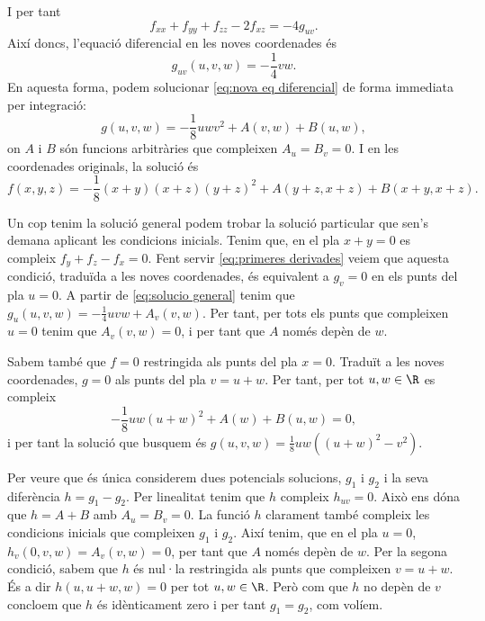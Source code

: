 \documentclass[12pt, a4paper]{article}
\begin{document}
I per tant 
\begin{equation}
  f_{xx} + f_{yy} + f_{zz} - 2f_{xz} = -4g_{uv}. 
\end{equation}
Així doncs, l'equació diferencial en les noves coordenades és 
\begin{equation}
  g_{uv}(u,v,w) = -\dfrac{1}{4}vw. \label{eq:nova eq diferencial}
\end{equation}
En aquesta forma, podem solucionar \ref{eq:nova eq diferencial} de forma immediata per integració:
\begin{equation}
  g(u,v,w) = -\dfrac{1}{8}uwv^2 + A(v,w) + B(u,w), \label{eq:solucio general}
\end{equation}
on \( A \) i \( B \) són funcions arbitràries que compleixen \( A_u = B_v = 0 \). I en les coordenades originals, la solució és
\begin{equation}
  f(x,y,z) = -\dfrac{1}{8}(x+y)(x+z)(y+z)^2 + A(y+z,x+z) + B(x+y,x+z).
\end{equation}

Un cop tenim la solució general podem trobar la solució particular que sen's demana aplicant les condicions inicials. Tenim que, en el pla \( x+y = 0 \) es compleix \( f_y + f_z - f_x = 0 \). Fent servir \ref{eq:primeres derivades} veiem que aquesta condició, traduïda a les noves coordenades, és equivalent a \( g_v = 0 \) en els punts del pla \( u = 0 \). A partir de \ref{eq:solucio general} tenim que \( g_u(u,v,w) = -\frac{1}{4}uvw + A_v(v,w) \). Per tant, per tots els punts que compleixen \( u = 0 \) tenim que \( A_v(v,w) = 0 \), i per tant que \( A \) només depèn de \( w \).

Sabem també que \( f = 0 \) restringida als punts del pla \( x = 0 \). Traduït a les noves coordenades, \( g = 0 \) als punts del pla \( v = u + w \). Per tant, per tot \( u,w \in \R \) es compleix
\begin{equation*}
  -\dfrac{1}{8}uw(u+w)^2 + A(w) + B(u,w) = 0,
\end{equation*}
i per tant la solució que busquem és \( g(u,v,w) = \frac{1}{8}uw\left((u+w)^2 - v^2\right) \).

Per veure que és única considerem dues potencials solucions, \( g_1 \) i \( g_2 \) i la seva diferència \( h = g_1 -g_2 \). Per linealitat tenim que \( h \) compleix \( h_{uv} = 0 \). Això ens dóna que \( h = A + B	\) amb \( A_u = B_v = 0 \). La funció \( h \) clarament també compleix les condicions inicials que compleixen \( g_1 \) i \( g_2 \). Així tenim, que en el pla \( u = 0 \), \( h_v(0,v,w) = A_v(v,w) = 0 \), per tant que \( A \) només depèn de \( w \). Per la segona condició, sabem que \( h \) és nul·la restringida als punts que compleixen \( v = u + w \). És a dir \( h(u,u+w,w) = 0 \) per tot \( u,w \in \R \). Però com que \( h \) no depèn de \( v \) concloem que \( h \) és idènticament zero i per tant \( g_1 = g_2 \), com volíem.
\end{document}
